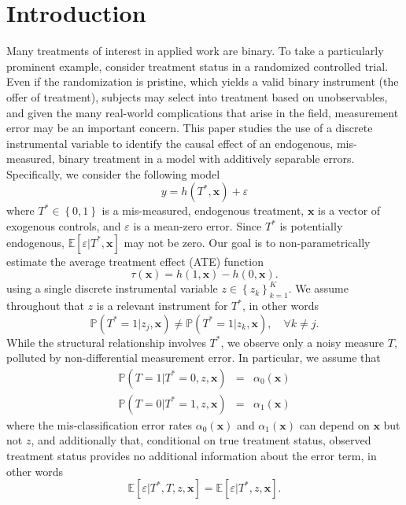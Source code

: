 \section{Introduction}
Many treatments of interest in applied work are binary.
To take a particularly prominent example, consider treatment status in a randomized controlled trial.
Even if the randomization is pristine, which yields a valid binary instrument (the offer of treatment), subjects may select into treatment based on unobservables, and given the many real-world complications that arise in the field, measurement error may be an important concern.
This paper studies the use of a discrete instrumental variable to identify the causal effect of an endogenous, mis-measured, binary treatment in a model with additively separable errors.
Specifically, we consider the following model 
\begin{equation}
  y = h(T^*, \mathbf{x}) + \varepsilon
  \label{eq:model}
\end{equation}
where $T^*\in \left\{ 0,1 \right\}$ is a mis-measured, endogenous treatment, $\mathbf{x}$ is a vector of exogenous controls, and $\varepsilon$ is a mean-zero error.
Since $T^*$ is potentially endogenous, $\mathbb{E}[\varepsilon|T^*,\mathbf{x}]$ may not be zero.
Our goal is to non-parametrically estimate the average treatment effect (ATE) function
\begin{equation}
  \tau(\mathbf{x}) = h(1,\mathbf{x}) - h(0,\mathbf{x}).
  \label{eq:ATE}
\end{equation}
using a single discrete instrumental variable $z \in \left\{ z_k \right\}_{k=1}^K$.
We assume throughout that $z$ is a relevant instrument for $T^*$, in other words 
\begin{equation}
\mathbb{P}(T^*=1|z_j,\mathbf{x})\neq \mathbb{P}(T^*=1|z_k,\mathbf{x}), \quad \forall k\neq j.
\end{equation}
While the structural relationship involves $T^*$, we observe only a noisy measure $T$, polluted by non-differential measurement error.
In particular, we assume that
\begin{eqnarray}
  \label{eq:a0}
  \mathbb{P}(T = 1| T^* = 0, z, \mathbf{x})  &=&  \alpha_0(\mathbf{x})\\
  \label{eq:a1}
  \mathbb{P}(T = 0| T^* = 1, z, \mathbf{x})  &=&  \alpha_1(\mathbf{x})
\end{eqnarray}
where the mis-classification error rates $\alpha_0(\mathbf{x})$ and $\alpha_1(\mathbf{x})$ can depend on $\mathbf{x}$ but not $z$, and additionally that, conditional on true treatment status, observed treatment status provides no additional information about the error term, in other words
\begin{equation}
  \mathbb{E}[\varepsilon|T^*,T,z,\mathbf{x}] =  \mathbb{E}[\varepsilon|T^*,z,\mathbf{x}].
  \label{eq:nondiff}
\end{equation}

